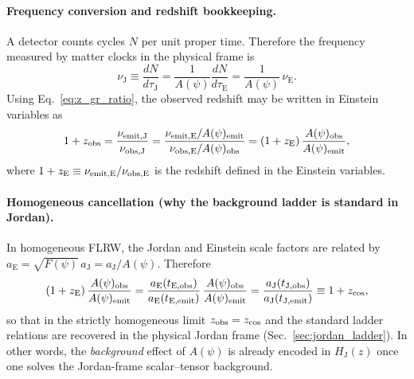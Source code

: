 \documentclass[10pt]{article}
\newcommand{\aJ}{a_{\mathrm{J}}}
\newcommand{\aE}{a_{\mathrm{E}}}
\newcommand{\HJ}{H_{\mathrm{J}}}
\newcommand{\Fpsi}{F(\psi)}
\newcommand{\Apsi}{A(\psi)}
\begin{document}
\paragraph{Frequency conversion and redshift bookkeeping.}
A detector counts cycles \(N\) per unit proper time. Therefore the frequency measured by matter clocks
in the physical frame is
\begin{equation}
\nu_{\mathrm{J}} \equiv \frac{dN}{d\tau_{\mathrm{J}}}
= \frac{1}{\Apsi}\frac{dN}{d\tau_{\mathrm{E}}}
= \frac{1}{\Apsi}\,\nu_{\mathrm{E}}.
\end{equation}
Using Eq.~\eqref{eq:z_gr_ratio}, the observed redshift may be written in Einstein variables as
\begin{equation}
1+z_{\rm obs}
= \frac{\nu_{\rm emit,J}}{\nu_{\rm obs,J}}
= \frac{\nu_{\rm emit,E}/\Apsi_{\rm emit}}{\nu_{\rm obs,E}/\Apsi_{\rm obs}}
= (1+z_{\rm E})\,\frac{\Apsi_{\rm obs}}{\Apsi_{\rm emit}},
\label{eq:zmap_endpoints_main}
\end{equation}
where \(1+z_{\rm E}\equiv \nu_{\rm emit,E}/\nu_{\rm obs,E}\) is the redshift defined in the Einstein
variables.

\paragraph{Homogeneous cancellation (why the background ladder is standard in Jordan).}
In homogeneous FLRW, the Jordan and Einstein scale factors are related by
\(\aE = \sqrt{\Fpsi}\,\aJ = \aJ/\Apsi\). Therefore
\begin{equation}
(1+z_{\rm E})\,\frac{\Apsi_{\rm obs}}{\Apsi_{\rm emit}}
=
\frac{\aE(t_{{\rm E,obs}})}{\aE(t_{{\rm E,emit}})}\,\frac{\Apsi_{\rm obs}}{\Apsi_{\rm emit}}
=
\frac{\aJ(t_{{\rm J,obs}})}{\aJ(t_{{\rm J,emit}})}
\equiv 1+z_{\rm cos},
\end{equation}
so that in the strictly homogeneous limit \(z_{\rm obs}=z_{\rm cos}\) and the standard ladder relations
are recovered in the physical Jordan frame (Sec.~\ref{sec:jordan_ladder}). In other words, the
\emph{background} effect of \(\Apsi\) is already encoded in \(\HJ(z)\) once one solves the Jordan-frame
scalar--tensor background.
\end{document}
